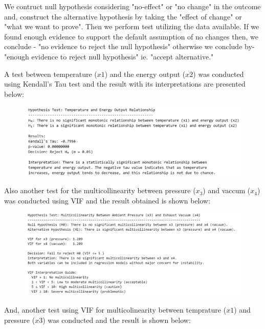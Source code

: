 \documentclass[12pt,a4paper]{article}
\begin{document}
We contruct null hypothesis considering "no-effect" or "no change" in the outcome and, construct the 
alternative hypothesis by taking the "effect of change" or "what we want to prove". Then we perform test
utilizing the data available. If we found enough evidence to support the default assumption of 
no changes then, we conclude - "no evidence to reject the null hypothesis" otherwise we conclude 
by- "enough evidence to reject null hypothesis" ie. "accept alternative." 

A test between temperature ($x1$) and the energy output ($x2$) was conducted using Kendall's 
Tau test and the result with its interpretations are presented below: 

\begin{figure}[H]
  \centering
  \includegraphics[width=\textwidth]{z13.png}
\end{figure}


Also another test for the multicollinearity between pressure ($x_3$) and vaccum ($x_4$) was conducted using VIF and 
the result obtained is shown below: 

\begin{figure}[H]
  \centering
  \includegraphics[width=\textwidth]{z14.png}
\end{figure}

And, another test using VIF for multicolinearity between temprature ($x1$) and pressure ($x3$) was 
conducted and the result is shown below: 
\end{document}
